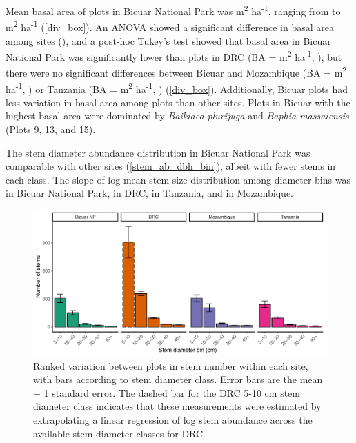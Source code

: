 \documentclass[diversity,article,submit,moreauthors,pdftex]{Definitions/mdpi}
\begin{document}
Mean basal area of plots in Bicuar National Park was \babicuar{} m\textsuperscript{2} ha\textsuperscript{-1}, ranging from \bicuarbamin{} to \bicuarbamax{} m\textsuperscript{2} ha\textsuperscript{-1} (\autoref{div_box}). An ANOVA showed a significant difference in basal area among sites (\lmba{}), and a post-hoc Tukey's test showed that basal area in Bicuar National Park was significantly lower than plots in DRC (BA = \badrc{} m\textsuperscript{2} ha\textsuperscript{-1}, \tukeybabicuardrc{}), but there were no significant differences between Bicuar and Mozambique (BA = \banham{} m\textsuperscript{2} ha\textsuperscript{-1}, \tukeybabicuarnham{}) or Tanzania (BA = \bakilwa{} m\textsuperscript{2} ha\textsuperscript{-1}, \tukeybabicuarkilwa{}) (\autoref{div_box}). Additionally, Bicuar plots had less variation in basal area among plots than other sites. Plots in Bicuar with the highest basal area were dominated by \textit{Baikiaea plurijuga} and \textit{Baphia massaiensis} (Plots 9, 13, and 15). 

The stem diameter abundance distribution in Bicuar National Park was comparable with other sites (\autoref{stem_ab_dbh_bin}), albeit with fewer stems in each class. The slope of log mean stem size distribution among diameter bins was \dbhslopebicuar{} in Bicuar National Park, \dbhslopedrc{} in DRC, \dbhslopekilwa{} in Tanzania, and \dbhslopenham{} in Mozambique.  

\begin{figure}[H]
\centering
	\includegraphics[width=\textwidth]{img/stem_ab_dbh_bin_group}
	\caption{Ranked variation between plots in stem number within each site, with bars according to stem diameter class. Error bars are the mean $\pm$ 1 standard error. The dashed bar for the DRC 5-10 cm stem diameter class indicates that these measurements were estimated by extrapolating a linear regression of log stem abundance across the available stem diameter classes for DRC.}
	\label{stem_ab_dbh_bin}
\end{figure}
\end{document}
